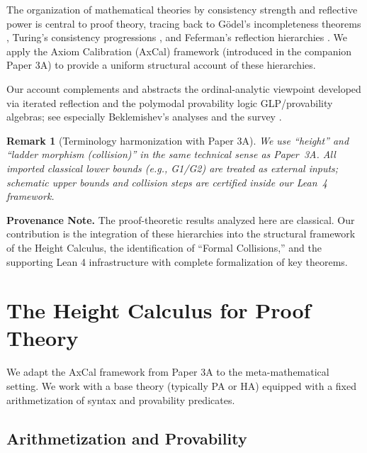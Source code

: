 \documentclass[11pt]{article}
\newtheorem{remark}[theorem]{Remark}
\begin{document}
The organization of mathematical theories by consistency strength and reflective power is central to proof theory, tracing back to Gödel's incompleteness theorems \cite{Godel1931}, Turing's consistency progressions \cite{Turing1939}, and Feferman's reflection hierarchies \cite{Feferman1962}. We apply the Axiom Calibration (AxCal) framework (introduced in the companion Paper 3A) to provide a uniform structural account of these hierarchies.

Our account complements and abstracts the ordinal-analytic viewpoint developed via iterated reflection and the polymodal provability logic GLP/provability algebras; see especially Beklemishev's analyses \cite{Beklemishev2003,Beklemishev2004} and the survey \cite{ArtemovBeklemishev2004}.

\begin{remark}[Terminology harmonization with Paper 3A]
We use ``height'' and ``ladder morphism (collision)'' in the same technical sense as Paper~3A. All imported classical lower bounds (e.g., G1/G2) are treated as external inputs; schematic upper bounds and collision steps are certified inside our Lean~4 framework.
\end{remark}

\begin{mdframed}[style=provenance]
\textbf{Provenance Note.} The proof-theoretic results analyzed here are classical. Our contribution is the integration of these hierarchies into the structural framework of the Height Calculus, the identification of ``Formal Collisions,'' and the supporting Lean 4 infrastructure with complete formalization of key theorems.
\end{mdframed}

\section{The Height Calculus for Proof Theory}

We adapt the AxCal framework from Paper 3A to the meta-mathematical setting. We work with a base theory (typically PA or HA) equipped with a fixed arithmetization of syntax and provability predicates.

\subsection{Arithmetization and Provability}
\end{document}
